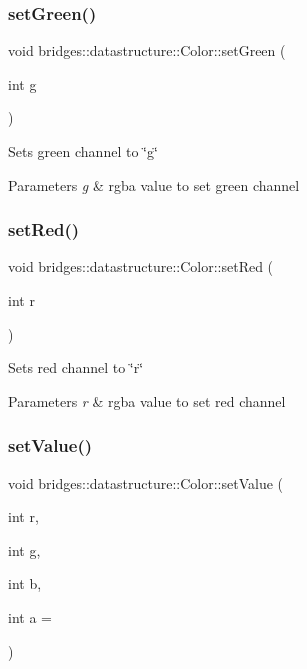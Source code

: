\subsubsection{\texorpdfstring{set\+Green()}{setGreen()}}
{\footnotesize\ttfamily void bridges\+::datastructure\+::\+Color\+::set\+Green (\begin{DoxyParamCaption}\item[{int}]{g }\end{DoxyParamCaption})\hspace{0.3cm}{\ttfamily [inline]}}

Sets green channel to \char`\"{}g\char`\"{} 
\begin{DoxyParams}{Parameters}
{\em g} & rgba value to set green channel \\
\hline
\end{DoxyParams}
\mbox{\label{classbridges_1_1datastructure_1_1_color_a487be07319fe83e9642cd0387ebed33a}} 
\subsubsection{\texorpdfstring{set\+Red()}{setRed()}}
{\footnotesize\ttfamily void bridges\+::datastructure\+::\+Color\+::set\+Red (\begin{DoxyParamCaption}\item[{int}]{r }\end{DoxyParamCaption})\hspace{0.3cm}{\ttfamily [inline]}}

Sets red channel to \char`\"{}r\char`\"{} 
\begin{DoxyParams}{Parameters}
{\em r} & rgba value to set red channel \\
\hline
\end{DoxyParams}
\mbox{\label{classbridges_1_1datastructure_1_1_color_aa23d4b981b994b4065f904195ffd8595}} 
\subsubsection{\texorpdfstring{set\+Value()}{setValue()}\hspace{0.1cm}{\footnotesize\ttfamily [1/2]}}
{\footnotesize\ttfamily void bridges\+::datastructure\+::\+Color\+::set\+Value (\begin{DoxyParamCaption}\item[{int}]{r,  }\item[{int}]{g,  }\item[{int}]{b,  }\item[{int}]{a = {} }\end{DoxyParamCaption})\hspace{0.3cm}{\ttfamily [inline]}}

